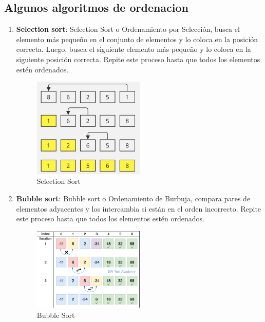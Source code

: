 \subsection*{Algunos algoritmos de ordenacion} 
\begin{enumerate}
    \item  \textbf{Selection sort}:
    Selection Sort o Ordenamiento por Selección, busca el elemento más pequeño en el conjunto de elementos y lo coloca en la posición correcta. 
    Luego, busca el siguiente elemento más pequeño y lo coloca en la siguiente posición correcta. Repite este proceso hasta que todos los elementos estén ordenados.
    \begin{figure}[H]
        \centering %
        \includegraphics[width=0.5\textwidth]{./src/images/selectionSort.png} %
        \caption{Selection Sort} %
        \label{fig:imagen 1} %
    \end{figure}
    \newpage

    \item \textbf{Bubble sort}:
    Bubble sort o Ordenamiento de Burbuja, compara pares de elementos adyacentes y los intercambia si están en el orden incorrecto. 
    Repite este proceso hasta que todos los elementos estén ordenados.
    \begin{figure}[H]
        \centering %
        \includegraphics[width=0.5\textwidth]{./src/images/BubbleSort.png} %
        \caption{Bubble Sort} %
        \label{fig:imagen 2} %
    \end{figure}
    


\end{enumerate}
